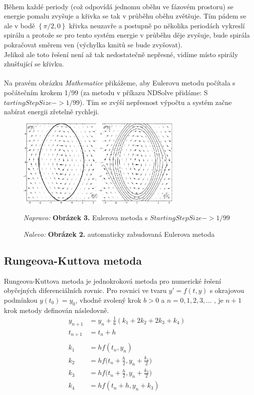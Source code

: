 \documentclass[reqno, a4paper]{amsart}
\begin{document}
		\\
		Během každé periody (což odpovídá jednomu oběhu ve fázovém prostoru) se energie pomalu zvyšuje a křivka se tak v průběhu oběhu zvětšuje. Tím pádem se ale v bodě $\left\lbrace \pi/2,0\right\rbrace $ křivka neuzavře a postupně po několika periodách vykreslí spirálu a protože se pro tento systém energie v průběhu děje zvyšuje, bude spirála pokračovat směrem ven (výchylka kmitů se bude zvyšovat). 
		\\
		Jelikož ale toto řešení není až tak nedostatečně nepřesné, vidíme místo spirály zhušťující se křivku.
		\\
		\\
		Na pravém obrázku \textit{Mathematice} přikážeme, aby Eulerovu metodu počítala s počátečním krokem 1/99 (za metodu v příkazu NDSolve přidáme: S$ tartingStepSize -> 1/99 $). Tím se zvýší nepřesnost výpočtu a systém začne nabírat energii zřetelně rychleji.
		\begin{figure}[h]
			\centering
			\includegraphics[width=0.72\textwidth]{pole2}
			\caption*{\textit{Nalevo:} \textbf{Obrázek 2.} automaticky zabudovaná Eulerova metoda}  \textit{Napravo:} \textbf{Obrázek 3.} Eulerova metoda s $StartingStepSize -> 1/99$  
		\end{figure}
		\clearpage
		\subsection{Rungeova-Kuttova metoda}
		\label{sec:Rungeova-Kuttova metoda}
		Rungeova-Kuttova metoda je jednokroková metoda pro numerické řešení obyčejných diferenciálních rovnic. Pro rovnici ve tvaru \( y'= f(t,y)\) s okrajovou podmínkou \(y(t_0)=y_0 \), vhodně zvolený krok \(b>0\) a \(n = 0, 1, 2, 3, ...\) , je $n+1$ krok metody definován následovně.
		\begin{align*}
			y_{n+1} &= y_n + \frac{1}{6} (k_1 + 2k_2 +2k_3 +k_4) \\
			t_{n+1} &= t_n +h \\ \\
			k_1 &= h f(t_n,y_n) \\
			k_2 &= h f\Big(t_n + \frac{h}{2},y_n + \frac{k_1}{2}\Big) \\
			k_3 &= h f\Big(t_n + \frac{h}{2},y_n + \frac{k_2}{2}\Big) \\
			k_4 &= h f(t_n + h ,y_n + k_3) 
		\end{align*}
\end{document}
